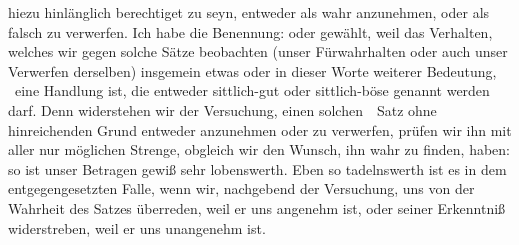 hiezu hinlänglich berechtiget zu seyn, entweder als wahr anzunehmen, oder als falsch zu verwerfen. Ich habe die Benennung:  oder  gewählt, weil das Verhalten, welches wir gegen solche Sätze beobachten (unser Fürwahrhalten oder auch unser Verwerfen derselben) insgemein etwas  oder  in dieser Worte weiterer Bedeutung, \dh\ eine Handlung ist, die entweder sittlich-gut oder sittlich-böse genannt werden darf. Denn widerstehen wir der Versuchung, einen solchen~\ Satz ohne hinreichenden Grund entweder anzunehmen oder zu verwerfen, prüfen wir ihn mit aller nur möglichen Strenge, obgleich wir den Wunsch, ihn wahr zu finden, haben: so ist unser Betragen gewiß sehr lobenswerth. Eben so tadelnswerth ist es in dem entgegengesetzten Falle, wenn wir, nachgebend der Versuchung, uns von der Wahrheit des Satzes überreden, weil er uns angenehm ist, oder seiner Erkenntniß widerstreben, weil er uns unangenehm ist.

